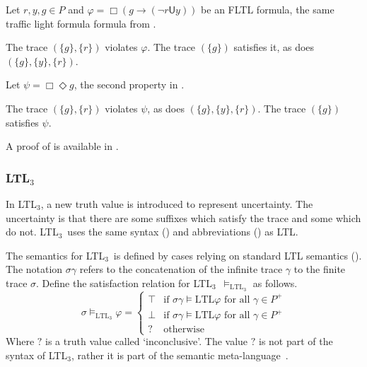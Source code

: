 \documentclass[a4paper]{article}
\newcommand{\U}{\mathsf{U}}
\newcommand{\fall}{\text{ for all }}
\newcommand{\ltlt}{LTL$_3$}
\begin{document}
\begin{eg}\label{fltleg}
  Let $r,y,g\in P$ and $\varphi = \Box (g \to (\neg r \U y))$ be an FLTL formula, the same traffic light formula formula from .

  The trace $(\{g\},\{r\})$ violates $\varphi$. The trace $(\{g\})$ satisfies it, as does $(\{g\},\{y\},\{r\})$.

  Let $\psi = \Box \Diamond g $, the second property in .

  The trace $(\{g\},\{r\})$ violates $\psi$, as does $(\{g\},\{y\},\{r\})$. The trace $(\{g\})$ satisfies $\psi$.

\end{eg}

A proof of  is available in \autocite[5.3]{bauer2010comparing}.

\subsubsection{\ltlt} In \ltlt, a new truth value is introduced to represent uncertainty. The uncertainty is that there are some suffixes which satisfy the trace and some which do not. \ltlt\ uses the same syntax () and abbreviations () as LTL.


\begin{defn}[\ltlt\ semantics]\label{ltltsem}

  The semantics for \ltlt\ is defined by cases relying on standard LTL semantics (). The notation $\sigma\gamma$ refers to the concatenation of the infinite trace $\gamma$ to the finite trace $\sigma$.
  Define the satisfaction relation for \ltlt\ $\vDash_{\text{\ltlt}}$ as follows.
  \[\sigma\vDash_{\text{\ltlt}}\varphi =
    \begin{cases}
      \top & \text{if } \sigma\gamma \vDash{\text{LTL}} \varphi \fall \gamma \in P^+\\
      \bot & \text{if } \sigma\gamma \vDash{\text{LTL}} \varphi \fall \gamma \in P^+\\
      ? & \text{otherwise}
    \end{cases}
    \]
    Where $?$ is a truth value called `inconclusive'. The value $?$ is not part of the syntax of \ltlt, rather it is part of the semantic meta-language~\autocite[659]{bauer2010comparing}.
\end{defn}
\end{document}
